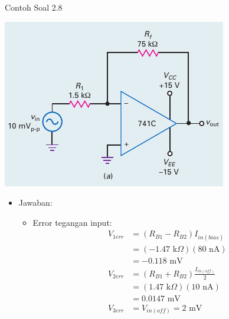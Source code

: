 \begin{frame}[t]{Contoh Soal 2.8}
	\begin{multicols}{2}
		\begin{center}
			\includegraphics[width=\linewidth]{gambar/fig-16.17a}
		\end{center}
		\columnbreak
		\begin{itemize}
			\item Jawaban:
			\begin{itemize}
				\item Error tegangan input:
				\begin{align*}
					V_{1err} &= (R_{B1} - R_{B2})I_{in(bias)} \\
					&= ( - 1.47 \text{ k}\Omega )(80 \text{ nA}) \\
					&= -0.118 \text{ mV} \\
					V_{2err} &= (R_{B1} + R_{B2}) \frac{I_{in(off)}}{2} \\
					&= ( 1.47 \text{ k}\Omega )(10 \text{ nA}) \\
					&= 0.0147 \text{ mV} \\
					V_{3err} &= V_{in(off)} = 2 \text{ mV}
				\end{align*}
			\end{itemize}
		\end{itemize}
	\end{multicols}
\end{frame}

